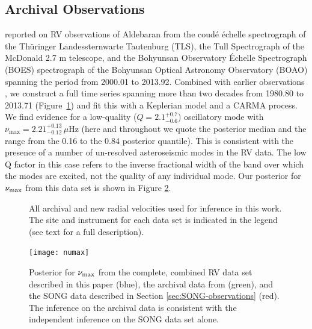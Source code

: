 \documentclass[modern]{aastex61}
\newcommand{\numax}{\mbox{$\nu_{\rm max}$}\xspace}
\newcommand{\twosidedrange}[3]{\ensuremath{#1^{+#2}_{-#3}}}
\newcommand{\HatzesQRange}{\twosidedrange{2.1}{0.7}{0.6}}
\newcommand{\HatzesNuMaxRange}{\twosidedrange{2.21}{0.13}{0.12}}
\begin{document}
\subsection{Archival Observations}
\label{sec:archival-obs}

\citet{Hatzes2015} reported on RV observations of Aldebaran from the coud\'{e}
\'{e}chelle spectrograph of the Th\"{u}ringer Landessternwarte Tautenburg (TLS),
the Tull Spectrograph of the McDonald 2.7 m telescope, and the Bohyunsan
Observatory \'{E}chelle Spectrograph (BOES) spectrograph of the Bohyunsan
Optical Astronomy Observatory (BOAO) spanning the period from 2000.01 to
2013.92.  Combined with earlier observations \citep{hatzes1993}, we construct a
full time series spanning more than two decades from 1980.80 to 2013.71
(Figure~\ref{alldata}) and fit this with a Keplerian model and a CARMA process.
We find evidence for a low-quality ($Q = \HatzesQRange{}$) oscillatory mode with
$\nu_\mathrm{max} = \HatzesNuMaxRange{} \, \mu\mathrm{Hz}$ (here and throughout
we quote the posterior median and the range from the 0.16 to the 0.84 posterior
quantile).  This is consistent with the presence of a number of un-resolved
asteroseismic modes in the RV data.  The low Q factor in this case refers to the
inverse fractional width of the band over which the modes are excited, not the
quality of any individual mode.  Our posterior for \numax{} from this data set
is shown in Figure \ref{fig:numax-datasets}.

\begin{figure}
\centering
{}
\caption{All archival and new radial velocities used for inference in this work.  The site and instrument for each data set is indicated in the legend (see text for a full description).}
\label{alldata}
\end{figure}

\begin{figure}
  \texttt{[image: numax]}
  \caption{Posterior for \numax{} from the complete, combined RV data set described in this paper (blue), the archival data from \citet{Hatzes2015} (green), and the SONG data described in Section \ref{sec:SONG-observations} (red).  The inference on the archival data is consistent with the independent inference on the SONG data set alone.}
  \label{fig:numax-datasets}
\end{figure}
\end{document}
